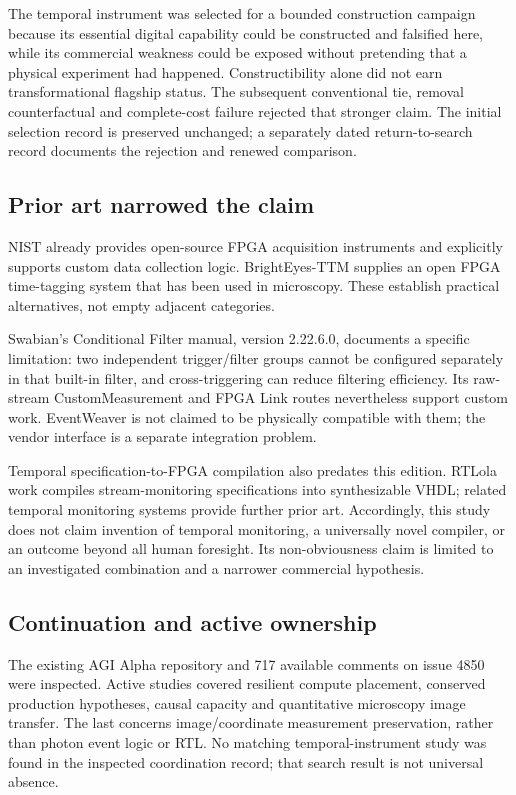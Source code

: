 The temporal instrument was selected for a bounded construction campaign because its essential digital capability could be constructed and falsified here, while its commercial weakness could be exposed without pretending that a physical experiment had happened. Constructibility alone did not earn transformational flagship status. The subsequent conventional tie, removal counterfactual and complete-cost failure rejected that stronger claim. The initial selection record is preserved unchanged; a separately dated return-to-search record documents the rejection and renewed comparison.

\subsection{Prior art narrowed the claim}
NIST already provides open-source FPGA acquisition instruments and explicitly supports custom data collection logic. BrightEyes-TTM supplies an open FPGA time-tagging system that has been used in microscopy. These establish practical alternatives, not empty adjacent categories.\cite{nist,brighteyes}

Swabian's Conditional Filter manual, version 2.22.6.0, documents a specific limitation: two independent trigger/filter groups cannot be configured separately in that built-in filter, and cross-triggering can reduce filtering efficiency. Its raw-stream CustomMeasurement and FPGA Link routes nevertheless support custom work. EventWeaver is not claimed to be physically compatible with them; the vendor interface is a separate integration problem.\cite{conditional,rawstream,fpgalink}

Temporal specification-to-FPGA compilation also predates this edition. RTLola work compiles stream-monitoring specifications into synthesizable VHDL; related temporal monitoring systems provide further prior art. Accordingly, this study does not claim invention of temporal monitoring, a universally novel compiler, or an outcome beyond all human foresight. Its non-obviousness claim is limited to an investigated combination and a narrower commercial hypothesis.\cite{rtlola,r2u2}

\subsection{Continuation and active ownership}
The existing AGI Alpha repository and 717 available comments on issue 4850 were inspected. Active studies covered resilient compute placement, conserved production hypotheses, causal capacity and quantitative microscopy image transfer. The last concerns image/coordinate measurement preservation, rather than photon event logic or RTL. No matching temporal-instrument study was found in the inspected coordination record; that search result is not universal absence.

